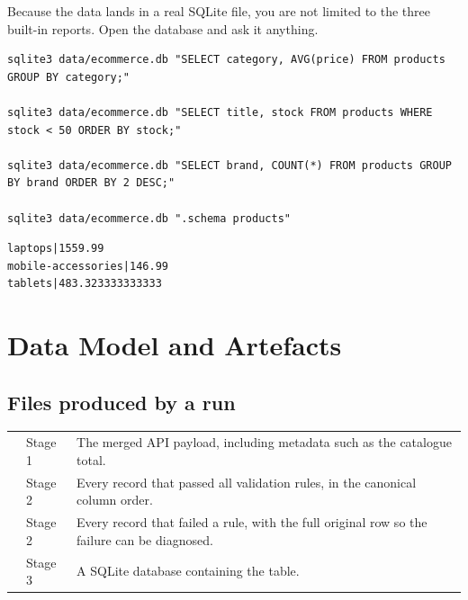 Because the data lands in a real SQLite file, you are not limited to the
three built-in reports. Open the database and ask it anything.

\begin{codebox}
\noindent
\begin{lstlisting}[style=sh]
sqlite3 data/ecommerce.db "SELECT category, AVG(price) FROM products GROUP BY category;"

sqlite3 data/ecommerce.db "SELECT title, stock FROM products WHERE stock < 50 ORDER BY stock;"

sqlite3 data/ecommerce.db "SELECT brand, COUNT(*) FROM products GROUP BY brand ORDER BY 2 DESC;"

sqlite3 data/ecommerce.db ".schema products"
\end{lstlisting}
\end{codebox}

\begin{codebox}
\noindent
\begin{lstlisting}[style=txt]
laptops|1559.99
mobile-accessories|146.99
tablets|483.323333333333
\end{lstlisting}
\end{codebox}

\section{Data Model and Artefacts}

\subsection{Files produced by a run}

\noindent
\begin{tabularx}{\textwidth}{@{}L{5.5cm}L{2.6cm}Y@{}}
 &  &  \\
\midrule
{} & Stage 1 &
The merged API payload, including metadata such as the catalogue total. \\
\addlinespace
{} & Stage 2 &
Every record that passed all validation rules, in the canonical column order. \\
\addlinespace
{} & Stage 2 &
Every record that failed a rule, with the full original row so the failure
can be diagnosed. \\
\addlinespace
{} & Stage 3 &
A SQLite database containing the  table. \\
\end{tabularx}


